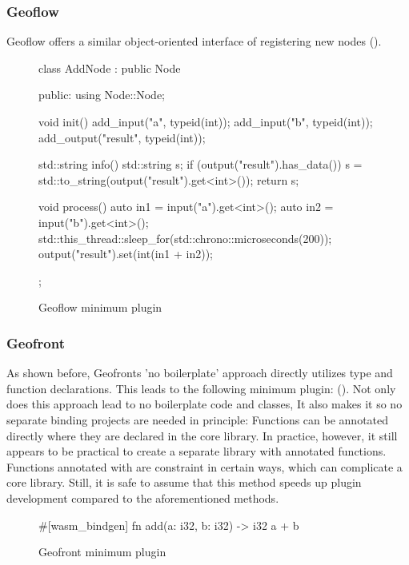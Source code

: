 \subsubsection{Geoflow}

Geoflow offers a similar object-oriented interface of registering new nodes (). 

\begin{figure}
\centering
\begin{code}
class AddNode : public Node
{
public:
  using Node::Node;

  void init()
  {
    add_input("a", typeid(int));
    add_input("b", typeid(int));
    add_output("result", typeid(int));
  }

  std::string info()
  {
    std::string s;
    if (output("result").has_data())
      s = std::to_string(output("result").get<int>());
    return s;
  }

  void process()
  {
    auto in1 = input("a").get<int>();
    auto in2 = input("b").get<int>();
    std::this_thread::sleep_for(std::chrono::microseconds(200));
    output("result").set(int(in1 + in2));
  }
};
\end{code}
\caption[]{Geoflow minimum plugin}
\label{fig:boilerplate:geoflow}
\end{figure}

\subsubsection{Geofront}

As shown before, Geofronts 'no boilerplate' approach directly utilizes type and function declarations.
This leads to the following minimum plugin: ().
Not only does this approach lead to no boilerplate code and classes, It also makes it so no separate binding projects are needed in principle: 
Functions can be annotated directly where they are declared in the core library. 
In practice, however, it still appears to be practical to create a separate library with annotated functions. 
Functions annotated with  are constraint in certain ways, which can complicate a core library.
Still, it is safe to assume that this method speeds up plugin development compared to the aforementioned methods.

\begin{figure}
\centering
\begin{code}
#[wasm_bindgen]
fn add(a: i32, b: i32) -> i32 {
  a + b
}
\end{code}
\caption[]{Geofront minimum plugin}
\label{fig:boilerplate:geofront}
\end{figure}


